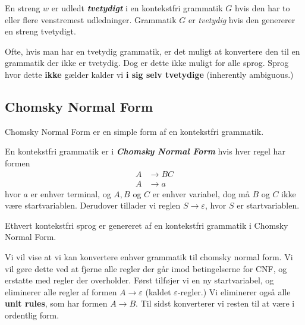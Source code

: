 \begin{definition}[Tvetydighed]
En streng $w$ er udledt \textbf{\textit{tvetydigt}} i en kontekstfri grammatik $G$ hvis den har to eller flere venstremest udledninger. Grammatik $G$ er \textit{tvetydig} hvis den genererer en streng tvetydigt.
\end{definition}

Ofte, hvis man har en tvetydig grammatik, er det muligt at konvertere den til en grammatik der ikke er tvetydig. Dog er dette ikke muligt for alle sprog. Sprog hvor dette \textbf{ikke} gælder kalder vi \textbf{i sig selv tvetydige} (inherently ambiguous.)

\newpage
\subsection{Chomsky Normal Form}%
\label{sub:cnf}

Chomsky Normal Form er en simple form af en kontekstfri grammatik.

\begin{definition}
  En kontekstfri grammatik er i \textbf{\textit{Chomsky Normal Form}} hvis hver regel har formen
  \begin{equation*}
\begin{split}
  A &\rightarrow BC\\
  A &\rightarrow a
\end{split}
  \end{equation*}
  hvor $a$ er enhver terminal, og $A, B$ og $C$ er enhver variabel, dog må $B$ og $C$ ikke være startvariablen. Derudover tillader vi reglen $S \rightarrow \varepsilon$, hvor $S$ er startvariablen.
\end{definition}

\begin{theorem}
Ethvert kontekstfri sprog er genereret af en kontekstfri grammatik i Chomsky Normal Form.
\end{theorem}

Vi vil vise at vi kan konvertere enhver grammatik til chomsky normal form. Vi vil gøre dette ved at fjerne alle regler der går imod betingelserne for CNF, og erstatte med regler der overholder. Først tilføjer vi en ny startvariabel, og eliminerer alle regler af formen $A \rightarrow \varepsilon$ (kaldet $\varepsilon$-regler.) Vi eliminerer også alle \textbf{unit rules}, som har formen $A \rightarrow B$. Til sidst konverterer vi resten til at være i ordentlig form.


